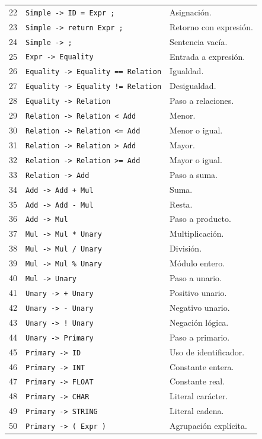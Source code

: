 \begin{longtable}{@{}r p{10.2cm} p{4.6cm}@{}}
22 & \texttt{Simple -\textgreater{} ID = Expr ;} & Asignación.\\
23 & \texttt{Simple -\textgreater{} return Expr ;} & Retorno con expresión.\\
24 & \texttt{Simple -\textgreater{} ;} & Sentencia vacía.\\
25 & \texttt{Expr -\textgreater{} Equality} & Entrada a expresión.\\
26 & \texttt{Equality -\textgreater{} Equality == Relation} & Igualdad.\\
27 & \texttt{Equality -\textgreater{} Equality != Relation} & Desigualdad.\\
28 & \texttt{Equality -\textgreater{} Relation} & Paso a relaciones.\\
29 & \texttt{Relation -\textgreater{} Relation \textless{} Add} & Menor.\\
30 & \texttt{Relation -\textgreater{} Relation \textless{}= Add} & Menor o igual.\\
31 & \texttt{Relation -\textgreater{} Relation \textgreater{} Add} & Mayor.\\
32 & \texttt{Relation -\textgreater{} Relation \textgreater{}= Add} & Mayor o igual.\\
33 & \texttt{Relation -\textgreater{} Add} & Paso a suma.\\
34 & \texttt{Add -\textgreater{} Add + Mul} & Suma.\\
35 & \texttt{Add -\textgreater{} Add - Mul} & Resta.\\
36 & \texttt{Add -\textgreater{} Mul} & Paso a producto.\\
37 & \texttt{Mul -\textgreater{} Mul * Unary} & Multiplicación.\\
38 & \texttt{Mul -\textgreater{} Mul / Unary} & División.\\
39 & \texttt{Mul -\textgreater{} Mul \% Unary} & Módulo entero.\\
40 & \texttt{Mul -\textgreater{} Unary} & Paso a unario.\\
41 & \texttt{Unary -\textgreater{} + Unary} & Positivo unario.\\
42 & \texttt{Unary -\textgreater{} - Unary} & Negativo unario.\\
43 & \texttt{Unary -\textgreater{} ! Unary} & Negación lógica.\\
44 & \texttt{Unary -\textgreater{} Primary} & Paso a primario.\\
45 & \texttt{Primary -\textgreater{} ID} & Uso de identificador.\\
46 & \texttt{Primary -\textgreater{} INT} & Constante entera.\\
47 & \texttt{Primary -\textgreater{} FLOAT} & Constante real.\\
48 & \texttt{Primary -\textgreater{} CHAR} & Literal carácter.\\
49 & \texttt{Primary -\textgreater{} STRING} & Literal cadena.\\
50 & \texttt{Primary -\textgreater{} ( Expr )} & Agrupación explícita.\\
\bottomrule\end{longtable}